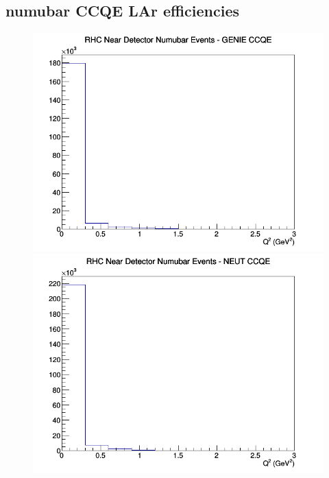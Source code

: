 \subsection{numubar CCQE LAr efficiencies}
\begin{figure}[h]
\includegraphics[width=\linewidth]{eff_Q2/LAr/CCQE_RHC_ND_numubar_Q2_GENIE.png}
\endminipage
{}
\includegraphics[width=\linewidth]{eff_Q2/LAr/CCQE_RHC_ND_numubar_Q2_NEUT.png}
\endminipage
{}

\end{figure}
